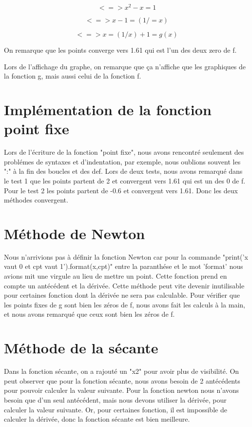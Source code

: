 \documentclass{article}
\begin{document}
$$<=> x^2 - x = 1$$

$$<=> x - 1 = (1 /= x)$$

$$<=> x = (1 / x) + 1 = g(x)$$

On remarque que les points converge vers 1.61 qui est l'un des deux zero de f.

Lors de l'affichage du graphe, on remarque que ça n'affiche que les graphiques de la fonction g, mais aussi celui de la fonction f.
$$ $$ 
\section{Implémentation de la fonction point fixe}
 
Lors de l'écriture de la fonction "point fixe", nous avons rencontré seulement des problémes de syntaxes et d'indentation, par exemple, nous oublions souvent les ":" à la fin des boucles et des def.
Lors de deux tests, nous avons remarqué dans le test 1 que les points partent de 2 et convergent vers 1.61 qui est un des 0 de f. Pour le test 2 les points partent de -0.6 et convergent vers 1.61. Donc les deux méthodes convergent.
$$ $$ 
\section{Méthode de Newton}

Nous n'arrivions pas à définir la fonction Newton car pour la commande "print('x vaut {0} et cpt vaut {1}').format(x,cpt)" entre la paranthése et le mot 'format' nous avions mit une virgule au lieu de mettre un point.
Cette fonction prend en compte un antécédent et la dérivée. Cette méthode peut vite devenir inutilisable pour certaines fonction dont la dérivée ne sera pas calculable.
Pour vérifier que les points fixes de g sont bien les zéros de f, nous avons fait les calculs à la main, et nous avons remarqué que ceux sont bien les zéros de f.
$$ $$ 
\section{Méthode de la sécante}

Dans la fonction sécante, on a rajouté un "x2" pour avoir plus de visibilité. On peut observer que pour la fonction sécante, nous avons besoin de 2 antécédents pour pouvoir calculer la valeur suivante. Pour la fonction newton nous n'avons besoin que d'un seul antécédent, mais nous devons utiliser la dérivée, pour calculer la valeur suivante.
Or, pour certaines fonction, il est impossible de calculer la dérivée, donc la fonction sécante est bien meilleure.
$$ $$ 
\end{document}
